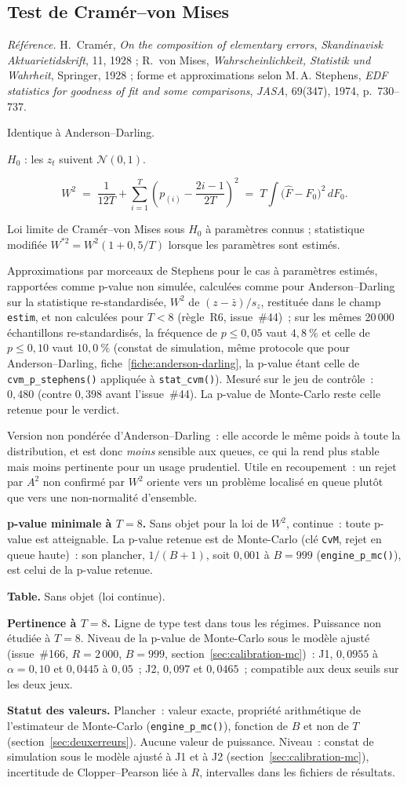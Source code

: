 \documentclass[a4paper,11pt]{article}
\newcommand{\code}[1]{\texttt{\small #1}}
\newcommand{\refl}[1]{{\small\textcolor{maincolor!70!black}{\textit{Référence.} #1}}\par\smallskip}
\newcounter{ficheid}
\newenvironment{fiche}[1]{%
  \stepcounter{ficheid}%
  \phantomsection
  \subsection{#1}%
  \label{fiche:\theficheid}%
}{%
  \end{description}\vspace{0.5em}%
}
\newcommand{\Cadre}{%
  \begin{description}[leftmargin=0pt, style=unboxed, itemsep=3pt, topsep=3pt, parsep=2pt]%
  \item[\textcolor{financeblue}{\textbf{1. Cadre, notations et hypothèses de validité (non testées).}}]}
\newcommand{\Hzero}{\item[\textcolor{financeblue}{\textbf{2. Hypothèse nulle.}}]}
\newcommand{\Stat}{\item[\textcolor{financeblue}{\textbf{3. Statistique de test.}}]}
\newcommand{\Loi}{\item[\textcolor{financeblue}{\textbf{4. Loi sous $H_0$.}}]}
\newcommand{\Pval}{\item[\textcolor{financeblue}{\textbf{5. p-value.}}]}
\newcommand{\Usage}{\item[\textcolor{financeblue}{\textbf{6. Usage et limites.}}]}
\newcommand{\Pertinence}{\item[\textcolor{financeblue}{\textbf{7. Pertinence et puissance à faible $T$.}}]}
\begin{document}
\begin{fiche}{Test de Cramér--von Mises}
\label{fiche:cramer-von-mises}%
\refl{H.~Cramér, \emph{On the composition of elementary errors}, \emph{Skandinavisk
Aktuarietidskrift}, 11, 1928 ; R.~von Mises, \emph{Wahrscheinlichkeit, Statistik und Wahrheit},
Springer, 1928 ; forme et approximations selon M.\,A. Stephens, \emph{EDF statistics for goodness
of fit and some comparisons}, \emph{JASA}, 69(347), 1974, p.~730--737.}
\Cadre
Identique à Anderson--Darling.
\Hzero
$H_0$ : les $z_t$ suivent $\mathcal{N}(0,1)$.
\Stat
\[
  W^2 \;=\; \frac{1}{12T} + \sum_{i=1}^{T}\left(p_{(i)} - \frac{2i-1}{2T}\right)^{2}
  \;=\; T\int \big(\hat F - F_0\big)^2\, dF_0 .
\]
\Loi
Loi limite de Cramér--von Mises sous $H_0$ à paramètres connus ; statistique modifiée
$W^{*2} = W^2(1 + 0{,}5/T)$ lorsque les paramètres sont estimés.
\Pval
Approximations par morceaux de Stephens pour le cas à paramètres estimés, rapportées comme
p-value non simulée, calculées comme pour Anderson--Darling sur la statistique re-standardisée,
$W^2$ de $(z - \bar z)/s_z$, restituée dans le champ \code{estim}, et non calculées pour
$T < 8$ (règle~R6, issue~\#44)~; sur les mêmes 20\,000 échantillons re-standardisés, la fréquence
de $p \le 0{,}05$ vaut $4{,}8~\%$ et celle de $p \le 0{,}10$ vaut $10{,}0~\%$ (constat de
simulation, même protocole que pour Anderson--Darling, fiche~\ref{fiche:anderson-darling}, la
p-value étant celle de \code{cvm\_p\_stephens()} appliquée à \code{stat\_cvm()}). Mesuré sur le jeu de contrôle~: $0{,}480$ (contre $0{,}398$ avant l'issue~\#44).
La p-value de Monte-Carlo reste celle retenue pour le verdict.
\Usage
Version non pondérée d'Anderson--Darling~: elle accorde le même poids à toute la distribution, et
est donc \emph{moins} sensible aux queues, ce qui la rend plus stable mais moins pertinente pour
un usage prudentiel. Utile en recoupement~: un rejet par $A^2$ non confirmé par $W^2$ oriente vers
un problème localisé en queue plutôt que vers une non-normalité d'ensemble.
\Pertinence
\textbf{p-value minimale à $T = 8$.} Sans objet pour la loi de $W^2$, continue~: toute p-value est atteignable. La p-value retenue est de Monte-Carlo (clé \code{CvM}, rejet en queue haute)~: son plancher, $1/(B+1)$, soit $0{,}001$ à $B = 999$ (\code{engine\_p\_mc()}), est celui de la p-value retenue.

\textbf{Table.} Sans objet (loi continue).

\textbf{Pertinence à $T = 8$.} Ligne de type test dans tous les régimes. Puissance non étudiée à $T = 8$. Niveau de la p-value de Monte-Carlo sous le modèle ajusté (issue~\#166, $R = 2\,000$, $B = 999$, section~\ref{sec:calibration-mc})~: J1, $0{,}0955$ à $\alpha = 0{,}10$ et $0{,}0445$ à $0{,}05$~; J2, $0{,}097$ et $0{,}0465$~; compatible aux deux seuils sur les deux jeux.

\textbf{Statut des valeurs.} Plancher~: valeur exacte, propriété arithmétique de l'estimateur de Monte-Carlo (\code{engine\_p\_mc()}), fonction de $B$ et non de $T$ (section~\ref{sec:deuxerreurs}). Aucune valeur de puissance. Niveau~: constat de simulation sous le modèle ajusté à J1 et à J2 (section~\ref{sec:calibration-mc}), incertitude de Clopper--Pearson liée à $R$, intervalles dans les fichiers de résultats.
\end{fiche}
\end{document}

